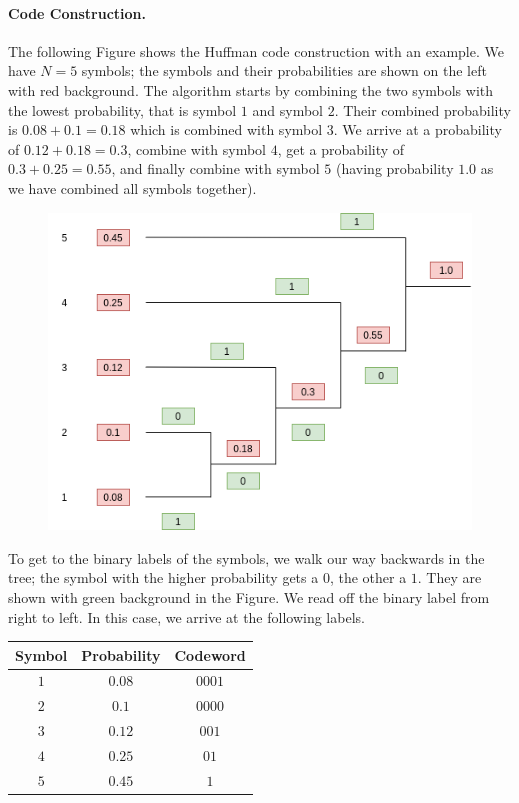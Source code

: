 \paragraph{Code Construction.} The following Figure shows the Huffman code construction with an example. We have $N = 5$ symbols; the symbols and their probabilities are shown on the left with red background. The algorithm starts by combining the two symbols with the lowest probability, that is symbol $1$ and symbol $2$. Their combined probability is $0.08 + 0.1 = 0.18$ which is combined with symbol $3$. We arrive at a probability of $0.12 + 0.18 = 0.3$, combine with symbol $4$, get a probability of $0.3 + 0.25 = 0.55$, and finally combine with symbol $5$ (having probability $1.0$ as we have combined all symbols together).

\begin{figure}[H]
    \centering
    \includegraphics[scale=0.5]{images/2021-04-14-code_1.png}
\end{figure}

To get to the binary labels of the symbols, we walk our way backwards in the tree; the symbol with the higher probability gets a $0$, the other a $1$. They are shown with green background in the Figure. We read off the binary label from right to left. In this case, we arrive at the following labels.

\vspace{3mm}

\begin{tabular}{cc|c}
    Symbol & Probability & Codeword \\ \hline
    $1$ & $0.08$ & $0001$ \\
    $2$ & $0.1$ & $0000$ \\
    $3$ & $0.12$ & $001$ \\
    $4$ & $0.25$ & $01$ \\
    $5$ & $0.45$ & $1$
\end{tabular}

